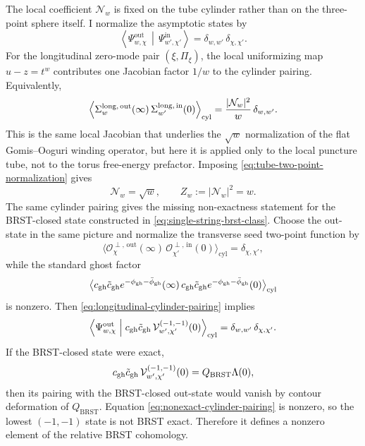 \documentclass[11pt]{article}
\newcommand{\mc}[1]{\mathcal{#1}}
\newcommand{\gh}{\mathrm{gh}}
\begin{document}
The local coefficient $\mc N_w$ is fixed on the tube cylinder rather than on the three-point sphere itself. I normalize the asymptotic states by
\begin{equation}\label{eq:tube-two-point-normalization}
\left\langle \Psi_{w,\chi}^{\mathrm{out}} \,\middle|\, \Psi_{w',\chi'}^{\mathrm{in}} \right\rangle
=
\delta_{w,w'}\,\delta_{\chi,\chi'}.
\end{equation}
For the longitudinal zero-mode pair $(\xi,\Pi_\xi)$, the local uniformizing map $u-z=t^w$ contributes one Jacobian factor $1/w$ to the cylinder pairing. Equivalently,
\begin{equation}\label{eq:longitudinal-cylinder-pairing}
\left\langle
\Sigma_{w}^{\rm long,\,out}(\infty)\,
\Sigma_{w'}^{\rm long,\,in}(0)
\right\rangle_{\mathrm{cyl}}
=
\frac{|\mc N_w|^2}{w}\,\delta_{w,w'}.
\end{equation}
This is the same local Jacobian that underlies the $\sqrt{w}$ normalization of the flat Gomis--Ooguri winding operator, but here it is applied only to the local puncture tube, not to the torus free-energy prefactor. Imposing \eqref{eq:tube-two-point-normalization} gives
\begin{equation}\label{eq:local-normalization-sqrtw}
\mc N_w=\sqrt{w},
\qquad
Z_w:=|\mc N_w|^2=w.
\end{equation}
The same cylinder pairing gives the missing non-exactness statement for the BRST-closed state constructed in \eqref{eq:single-string-brst-class}. Choose the out-state in the same picture and normalize the transverse seed two-point function by
\[
\bigl\langle \mc O_{\chi}^{\perp,\,\mathrm{out}}(\infty)\,
\mc O_{\chi'}^{\perp,\,\mathrm{in}}(0)\bigr\rangle_{\mathrm{cyl}}
=
\delta_{\chi,\chi'},
\]
while the standard ghost factor
\[
\bigl\langle
c_{\rm gh}\tilde c_{\rm gh}e^{-\phi_{\gh}-\bar\phi_{\gh}}(\infty)\,
c_{\rm gh}\tilde c_{\rm gh}e^{-\phi_{\gh}-\bar\phi_{\gh}}(0)
\bigr\rangle_{\mathrm{cyl}}
\]
is nonzero. Then \eqref{eq:longitudinal-cylinder-pairing} implies
\begin{equation}\label{eq:nonexact-cylinder-pairing}
\Bigl\langle
\Psi_{w,\chi}^{\mathrm{out}}
\Bigm|
c_{\rm gh}\tilde c_{\rm gh}\,\mc V^{(-1,-1)}_{w',\chi'}(0)
\Bigr\rangle_{\mathrm{cyl}}
=
\delta_{w,w'}\,\delta_{\chi,\chi'}.
\end{equation}
If the BRST-closed state were exact,
\[
c_{\rm gh}\tilde c_{\rm gh}\,\mc V^{(-1,-1)}_{w',\chi'}(0)
=
Q_{\mathrm{BRST}}\Lambda(0),
\]
then its pairing with the BRST-closed out-state would vanish by contour deformation of $Q_{\mathrm{BRST}}$. Equation \eqref{eq:nonexact-cylinder-pairing} is nonzero, so the lowest $(-1,-1)$ state is not BRST exact. Therefore it defines a nonzero element of the relative BRST cohomology.
\end{document}
